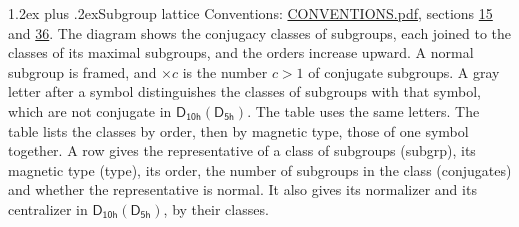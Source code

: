 \documentclass[10pt,a4paper]{article}
\makeatletter
\renewcommand\section{\@startsection{section}{1}{\z@}{-3ex plus -1ex minus -.2ex}%
  {1.2ex plus .2ex}{\normalfont\large\sffamily\bfseries\color{parttitle}}}
\numberwithin{equation}{section}
\newcommand{\grp}[1]{\mathsf{#1}}
\makeatother
\begin{document}
\section{Subgroup lattice}\label{s:subgroups}
Conventions: \href{../../CONVENTIONS.pdf}{CONVENTIONS.pdf}, sections \href{../../../rotation/CONVENTIONS.pdf\#conv.15}{15} and \href{../../CONVENTIONS.pdf\#conv.36}{36}.
The diagram shows the conjugacy classes of subgroups, each joined to the classes of its maximal subgroups, and the orders increase upward. \label{n:index.conjugates.c}\label{n:mark.conjugates}A normal subgroup is framed, and ${\times}c$ is the number $c > 1$ of conjugate subgroups. \label{n:mark.letter}A gray letter after a symbol distinguishes the classes of subgroups with that symbol, which are not conjugate in $\grp{D_{10h}}(\grp{D_{5h}})$. The table uses the same letters. The table lists the classes by order, then by magnetic type, those of one symbol together. \label{n:head.subgroup}\label{n:head.magnetic.type}\label{n:head.order}\label{n:head.conjugates}\label{n:head.normal}A row gives the representative of a class of subgroups (subgrp), its magnetic type (type), its order, the number of subgroups in the class (conjugates) and whether the representative is normal. \label{n:head.normalizer}\label{n:head.centralizer}It also gives its normalizer and its centralizer in $\grp{D_{10h}}(\grp{D_{5h}})$, by their classes. 
\end{document}
